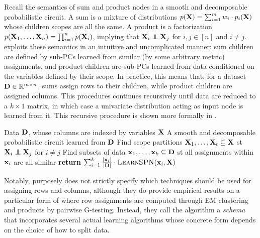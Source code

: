 Recall the semantics of sum and product nodes in a smooth and decomposable probabilistic circuit.
A sum is a mixture of distributions $p(\mathbf{X})=\sum_{i=1}^m w_i\cdot p_i(\mathbf{X})$ whose children
scopes are all the same. A product is a factorization $p(\mathbf{X}_1,\ldots,\mathbf{X}_n)=\prod_{i=1}^n
p(\mathbf{X}_i)$, implying that $\set{X}_i\indep\set{X}_j$ for $i,j\in [n]$ and $i\neq j$.
 \citep{gens13} exploits these semantics in an intuitive and uncomplicated
manner: sum children are defined by sub-PCs learned from similar (by some arbitrary metric)
assignments, and product children are sub-PCs learned from data conditioned on the variables
defined by their scope. In practice, this means that, for a dataset $\mathbf{D}\in\mathbb{R}^{m\times
n}$, sums assign rows to their children, while product children are assigned columns. This
procedures continues recursively until data are reduced to a $k\times 1$ matrix, in which case a
univariate distribution acting as input node is learned from it. This recursive procedure is shown
more formally in .

\begin{algorithm}[t]
  \caption{}\label{alg:learnspn}
  \begin{algorithmic}[1]
    \Require Data $\mathbf{D}$, whose columns are indexed by variables $\mathbf{X}$
    \Ensure A smooth and decomposable probabilistic circuit learned from $\mathbf{D}$
    \NIElse
      \State Find scope partitions $\mathbf{X}_1,\ldots,\mathbf{X}_t\subseteq\mathbf{X}$ st
        $\set{X}_i\indep\set{X}_j$ for $i\neq j$
      \NIElse
        \State Find subsets of data $\mathbf{x}_1,\ldots,\mathbf{x}_k\subseteq\mathbf{D}$ st all assignments
          within $\mathbf{x}_i$ are all similar
        \State \textbf{return} $\sum_{i=1}^k \frac{|\set{x}_i|}{|\set{D}|}\cdot
          \textproc{LearnSPN}(\set{x}_i,\set{X})$
      \EndNIElse
    \EndNIElse
  \end{algorithmic}
\end{algorithm}

Notably, \citep{gens13} purposely does not strictly specify which techniques should be used for
assigning rows and columns, although they do provide empirical results on a particular form of
 where row assignments are computed through EM clustering and products by
pairwise G-testing. Instead, they call the algorithm a \emph{schema} that incorporates several
actual learning algorithms whose concrete form depends on the choice of how to split data.


